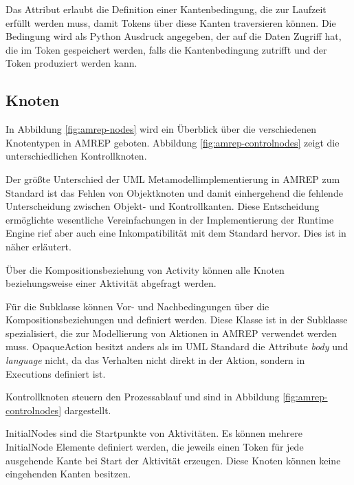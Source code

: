 Das Attribut  erlaubt die Definition einer Kantenbedingung, die zur Laufzeit erfüllt werden muss, damit Tokens über diese Kanten traversieren können. Die Bedingung wird als Python Ausdruck angegeben, der auf die Daten Zugriff hat, die im Token gespeichert werden, falls die Kantenbedingung zutrifft und der Token produziert werden kann.



\subsection{Knoten}
In Abbildung \ref{fig:amrep-nodes} wird ein Überblick über die verschiedenen Knotentypen in AMREP geboten. Abbildung \ref{fig:amrep-controlnodes} zeigt die unterschiedlichen Kontrollknoten.

Der größte Unterschied der UML Metamodellimplementierung in AMREP zum Standard ist das Fehlen von Objektknoten und damit einhergehend die fehlende Unterscheidung zwischen Objekt- und Kontrollkanten. Diese Entscheidung ermöglichte wesentliche Vereinfachungen in der Implementierung der Runtime Engine rief aber auch eine Inkompatibilität mit dem Standard hervor. Dies ist in  näher erläutert.

Über die Kompositionsbeziehung  von Activity können alle Knoten beziehungsweise  einer Aktivität abgefragt werden.

Für die Subklasse  können Vor- und Nachbedingungen über die Kompositionsbeziehungen  und  definiert werden. Diese Klasse ist in der Subklasse  spezialisiert, die zur Modellierung von Aktionen in AMREP verwendet werden muss. OpaqueAction besitzt anders als im UML Standard die Attribute \emph{body} und \emph{language} nicht, da das Verhalten nicht direkt in der Aktion, sondern in Executions definiert ist.


Kontrollknoten steuern den Prozessablauf und sind in Abbildung \ref{fig:amrep-controlnodes} dargestellt.

InitialNodes sind die Startpunkte von Aktivitäten. Es können mehrere InitialNode Elemente definiert werden, die jeweils einen Token für jede ausgehende Kante bei Start der Aktivität erzeugen. Diese Knoten können keine eingehenden Kanten besitzen.

